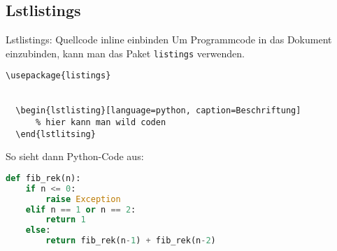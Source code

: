 \subsection{Lstlistings}
\begin{frame}[fragile]{Lstlistings: Quellcode inline einbinden}
Um Programmcode in das Dokument einzubinden, kann man das Paket \texttt{listings} verwenden.
\vspace{2ex}

\begin{lstlisting}[style=tex]
\usepackage{listings}


  \begin{lstlisting}[language=python, caption=Beschriftung]
      % hier kann man wild coden
  \end{lstlitsing}
\end{lstlisting}


So sieht dann Python-Code aus:
\begin{lstlisting}[language=python, caption = Berechnung der n-ten Fibonacci in Python durch Rekursion]
def fib_rek(n):
    if n <= 0:
        raise Exception
    elif n == 1 or n == 2:
        return 1
    else:
        return fib_rek(n-1) + fib_rek(n-2)
\end{lstlisting}

\end{frame}

